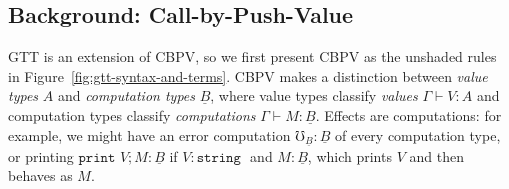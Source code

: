 \documentclass[acmsmall,nonacm]{acmart}
\renewcommand{\u}{\underline}
\newcommand{\err}{\mho}
\newcommand{\print}{\kw{print}}
\newcommand{\kw}[1]{\texttt{#1}\,\,}
\begin{document}
\subsection{Background: Call-by-Push-Value}

GTT is an extension of CBPV, so we first present CBPV as the unshaded rules in
Figure~\ref{fig:gtt-syntax-and-terms}.  CBPV makes a distinction between
\emph{value types} $A$ and \emph{computation types} $\u B$, where value
types classify \emph{values} $\Gamma \vdash V : A$ and computation types
classify \emph{computations} $\Gamma \vdash M : \u B$.  Effects are
computations: for example, we might have an error computation $\err_{\u
  B} : \u B$ of every computation type, or printing $\print V;M : \u B$
if $V : \kw{string}$ and $M : \u B$, which prints $V$ and then behaves as
$M$.
\end{document}

